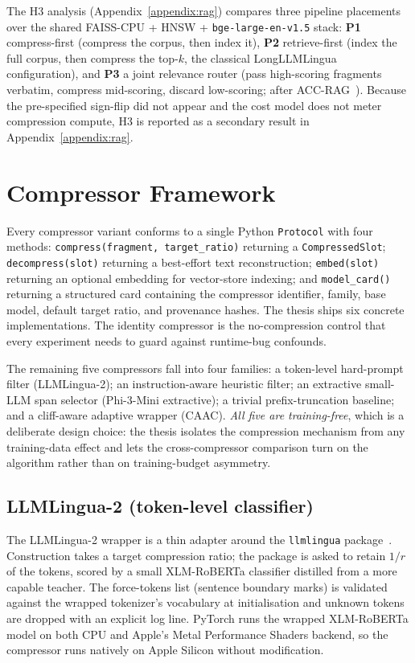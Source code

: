 The H3 analysis (Appendix~\ref{appendix:rag}) compares three
pipeline placements over the shared FAISS-CPU + HNSW +
\texttt{bge-large-en-v1.5} stack: \textbf{P1} compress-first
(compress the corpus, then index it), \textbf{P2} retrieve-first
(index the full corpus, then compress the top-$k$, the classical
LongLLMLingua~\cite{jiang2024longllmlingua} configuration), and
\textbf{P3} a joint relevance router (pass high-scoring fragments
verbatim, compress mid-scoring, discard low-scoring; after
ACC-RAG~\cite{guo2025dynamic}). Because the pre-specified sign-flip
did not appear and the cost model does not meter compression compute,
H3 is reported as a secondary result in Appendix~\ref{appendix:rag}.

\section{Compressor Framework}
\label{sec:compressors}

Every compressor variant conforms to a single Python \texttt{Protocol}
with four methods: \texttt{compress(fragment, target\_ratio)}
returning a \texttt{CompressedSlot}; \texttt{decompress(slot)}
returning a best-effort text reconstruction; \texttt{embed(slot)}
returning an optional embedding for vector-store indexing; and
\texttt{model\_card()} returning a structured card containing the
compressor identifier, family, base model, default target ratio, and
provenance hashes. The thesis ships six concrete implementations.
The identity compressor is the no-compression control that every
experiment needs to guard against runtime-bug confounds.

The remaining five compressors fall into four families: a
token-level hard-prompt filter (LLMLingua-2); an instruction-aware
heuristic filter; an extractive small-LLM span selector
(Phi-3-Mini extractive); a trivial prefix-truncation baseline; and a
cliff-aware adaptive wrapper (CAAC). \emph{All five are
training-free}, which is a deliberate design choice: the thesis
isolates the compression mechanism from any training-data effect
and lets the cross-compressor comparison turn on the algorithm
rather than on training-budget asymmetry.

\subsection{LLMLingua-2 (token-level classifier)}

The LLMLingua-2 wrapper is a thin adapter around the
\texttt{llmlingua} package~\cite{pan2024llmlingua2}. Construction
takes a target compression ratio; the package is asked to retain
$1/r$ of the tokens, scored by a small XLM-RoBERTa classifier
distilled from a more capable teacher. The force-tokens list
(sentence boundary marks) is validated against the wrapped
tokenizer's vocabulary at initialisation and unknown tokens are
dropped with an explicit log line. PyTorch runs the wrapped
XLM-RoBERTa model on both CPU and Apple's Metal Performance Shaders
backend, so the compressor runs natively on Apple Silicon without
modification.

